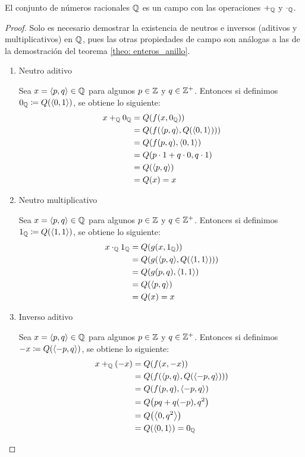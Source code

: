 \begin{theorem}
	El conjunto de números racionales $\QQ$ es un campo con las operaciones $+_{\QQ}$ y $\cdot_{\QQ}$.
\end{theorem}

\begin{proof}
	Solo es necesario demostrar la existencia de neutros e inversos (aditivos y multiplicativos) en $\QQ$, pues las otras propiedades de campo son análogas a las de la demostración del teorema \ref{theo: enteros_anillo}.

	\begin{enumerate}
		\item Neutro aditivo

		Sea $x =\inner*{p, q}\in\QQ$ para algunos $p\in\ZZ$ y $q\in\ZZ^{+}$. Entonces si definimos $0_{\QQ}\coloneqq Q\pa*{\inner*{0, 1}}$, se obtiene lo siguiente:
		\begin{align*}
			x +_{\QQ} 0_{\QQ} &= Q\pa*{f\pa*{x, 0_{\QQ}}}\\
			&= Q\pa*{f\pa*{\inner*{p, q}, Q\pa*{\inner*{0, 1}}}}\\
			&= Q\pa*{f\pa*{p, q},\inner*{0, 1}}\\
			&= Q\pa*{p\cdot 1 + q\cdot 0, q\cdot 1}\\
			&= Q\pa*{\inner*{p, q}}\\
			&= Q\pa*{x} = x
		\end{align*}
		\item Neutro multiplicativo

		Sea $x =\inner*{p, q}\in\QQ$ para algunos $p\in\ZZ$ y $q\in\ZZ^{+}$. Entonces si definimos $1_{\QQ}\coloneqq Q\pa*{\inner*{1, 1}}$, se obtiene lo siguiente:
		\begin{align*}
			x\cdot_{\QQ} 1_{\QQ} &= Q\pa*{g\pa*{x, 1_{\QQ}}}\\
			&= Q\pa*{g\pa*{\inner*{p, q}, Q\pa*{\inner*{1, 1}}}}\\
			&= Q\pa*{g\pa*{p, q},\inner*{1, 1}}\\
			&= Q\pa*{\inner*{p, q}}\\
			&= Q\pa*{x} = x
		\end{align*}

		\item Inverso aditivo

		Sea $x =\inner*{p, q}\in\QQ$ para algunos $p\in\ZZ$ y $q\in\ZZ^{+}$. Entonces si definimos $-x\coloneqq Q\pa*{\inner*{-p, q}}$, se obtiene lo siguiente:
		\begin{align*}
			x +_{\QQ}\pa*{-x} &= Q\pa*{f\pa*{x, -x}}\\
			&= Q\pa*{f\pa*{\inner*{p, q}, Q\pa*{\inner*{-p, q}}}}\\
			&= Q\pa*{f\pa*{p, q},\inner*{-p, q}}\\
			&= Q\pa*{pq + q\pa*{-p}, q^{2}}\\
			&= Q\pa*{\inner*{0, q^{2}}}\\
			&= Q\pa*{\inner*{0, 1}} = 0_{\QQ}
		\end{align*}


\end{enumerate}
\end{proof}
